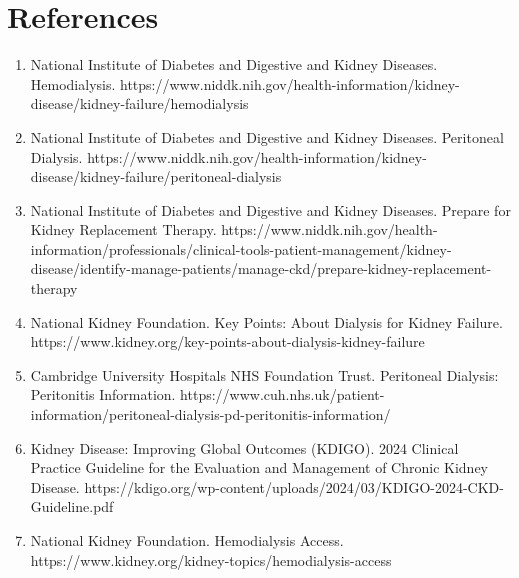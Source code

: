 \section*{References}
\begin{enumerate}
  \item National Institute of Diabetes and Digestive and Kidney Diseases. Hemodialysis. https://www.niddk.nih.gov/health-information/kidney-disease/kidney-failure/hemodialysis
  \item National Institute of Diabetes and Digestive and Kidney Diseases. Peritoneal Dialysis. https://www.niddk.nih.gov/health-information/kidney-disease/kidney-failure/peritoneal-dialysis
  \item National Institute of Diabetes and Digestive and Kidney Diseases. Prepare for Kidney Replacement Therapy. https://www.niddk.nih.gov/health-information/professionals/clinical-tools-patient-management/kidney-disease/identify-manage-patients/manage-ckd/prepare-kidney-replacement-therapy
  \item National Kidney Foundation. Key Points: About Dialysis for Kidney Failure. https://www.kidney.org/key-points-about-dialysis-kidney-failure
  \item Cambridge University Hospitals NHS Foundation Trust. Peritoneal Dialysis: Peritonitis Information. https://www.cuh.nhs.uk/patient-information/peritoneal-dialysis-pd-peritonitis-information/
  \item Kidney Disease: Improving Global Outcomes (KDIGO). 2024 Clinical Practice Guideline for the Evaluation and Management of Chronic Kidney Disease. https://kdigo.org/wp-content/uploads/2024/03/KDIGO-2024-CKD-Guideline.pdf
  \item National Kidney Foundation. Hemodialysis Access. https://www.kidney.org/kidney-topics/hemodialysis-access
\end{enumerate}

\clearpage
